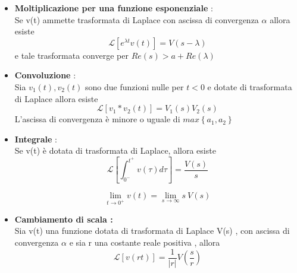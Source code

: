 \documentclass{article}
\theoremstyle{definition}
\newcommand{\la}{\lambda}
\begin{document}
\begin{itemize}
	\item \textbf{Moltiplicazione per una funzione esponenziale} : \\
	Se v(t) ammette trasformata di Laplace con ascissa di convergenza $\alpha$ allora esiste 
	$$\mathcal{L}[e^{\la t}v(t)]=V(s-\la)$$ e tale trasformata converge per $Re(s)>a +Re(\la) $
	\item \textbf{Convoluzione} : 	\\
	Sia $v_1(t),v_2(t)$ sono due funzioni nulle per $t<0$ e dotate di trasformata di Laplace  allora esiste 
	$$\mathcal{L}[v_1*v_2(t)]=V_1(s)V_2(s)$$
	L'ascissa di convergenza è minore o uguale di $max\left\{a_1,a_2\right\}$
	\item \textbf{Integrale} : \\
	Se v(t)  è dotata di trasformata di Laplace, allora esiste 
	$$\mathcal{L}\left[\int_{0^-}^{t^+}v(\tau)d\tau\right]=\frac{V(s)}{s}$$
	
	$$\lim_{t \rightarrow 0^+} v(t)=\lim_{s \rightarrow \infty} s \ V\left(s\right)$$
	\item \textbf{Cambiamento di scala :} \\ 
		Sia v(t) una funzione dotata di trasformata di Laplace V(s) , con ascissa di convergenza $\alpha$ e sia r una costante reale positiva , allora 
	$$\mathcal{L}\left[v(rt)\right]=\frac{1}{|r|}V\left(\frac{s}{r}\right)$$
	\end{itemize}
	
\end{document}
